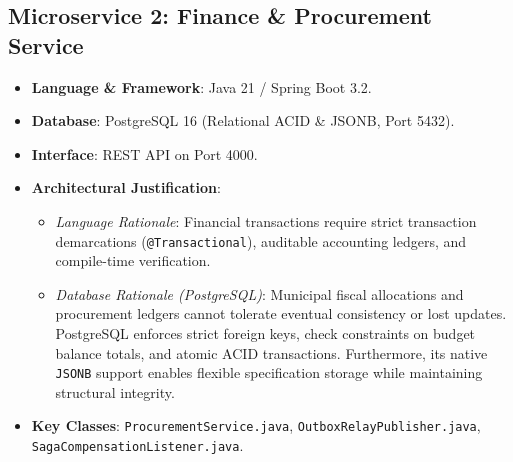 \documentclass[11pt,a4paper]{article}
\begin{document}
\subsection{Microservice 2: Finance \& Procurement Service}
\begin{itemize}[leftmargin=1.5em]
    \item \textbf{Language \& Framework}: Java 21 / Spring Boot 3.2.
    \item \textbf{Database}: PostgreSQL 16 (Relational ACID \& JSONB, Port 5432).
    \item \textbf{Interface}: REST API on Port 4000.
    \item \textbf{Architectural Justification}:
    \begin{itemize}
        \item \textit{Language Rationale}: Financial transactions require strict transaction demarcations (\texttt{@Transactional}), auditable accounting ledgers, and compile-time verification.
        \item \textit{Database Rationale (PostgreSQL)}: Municipal fiscal allocations and procurement ledgers cannot tolerate eventual consistency or lost updates. PostgreSQL enforces strict foreign keys, check constraints on budget balance totals, and atomic ACID transactions. Furthermore, its native \texttt{JSONB} support enables flexible specification storage while maintaining structural integrity.
    \end{itemize}
    \item \textbf{Key Classes}: \texttt{ProcurementService.java}, \texttt{OutboxRelayPublisher.java}, \texttt{SagaCompensationListener.java}.
\end{itemize}
\end{document}
